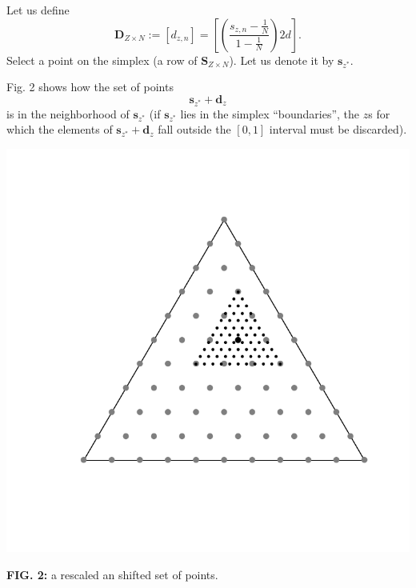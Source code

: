 \documentclass[12pt,a4paper]{article}
\begin{document}
Let us define
\[
\textbf{D}_{Z\times N}:=[d_{z,n}]=\left[\left(\frac{s_{z,n}-\frac{1}{N}}{1-\frac{1}{N}}\right)2d\right].
\]
Select a point on the simplex (a row of $\textbf{S}_{Z\times N}$). Let us denote it by $\textbf{s}_{z^*}$.

Fig. 2 shows how the set of points 
\[
\textbf{s}_{z^*}+\textbf{d}_{z}
\]
is in the neighborhood of $\textbf{s}_{z^*}$ (if $\textbf{s}_{z^*}$ lies in the simplex ``boundaries'', the $z$s for which the elements of $\textbf{s}_{z^*}+\textbf{d}_{z}$ fall outside the $[0,1]$ interval must be discarded). 

\centerline{\includegraphics[scale=0.5]{fig2.pdf}}
\vspace{-1cm}
\textbf{FIG. 2:} a rescaled an shifted set of points.

\newpage
\end{document}
